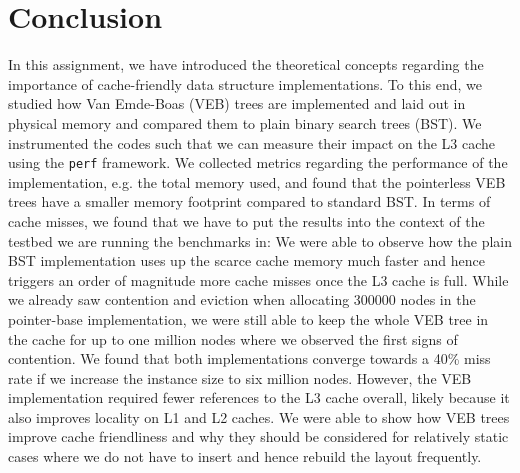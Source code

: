 \documentclass{article}
\begin{document}
\section{Conclusion}
In this assignment, we have introduced the theoretical concepts regarding the importance of cache-friendly data structure implementations. To this end, we studied how Van Emde-Boas (VEB) trees are implemented and laid out in physical memory and compared them to plain binary search trees (BST). We instrumented the codes such that we can measure their impact on the L3 cache using the \texttt{perf} framework. We collected metrics regarding the performance of the implementation, e.g. the total memory used, and found that the pointerless VEB trees have a smaller memory footprint compared to standard BST. In terms of cache misses, we found that we have to put the results into the context of the testbed we are running the benchmarks in: We were able to observe how the plain BST implementation uses up the scarce cache memory much faster and hence triggers an order of magnitude more cache misses once the L3 cache is full. While we already saw contention and eviction when allocating 300000 nodes in the pointer-base implementation, we were still able to keep the whole VEB tree in the cache for up to one million nodes where we observed the first signs of contention. We found that both implementations converge towards a 40\% miss rate if we increase the instance size to six million nodes. However, the VEB implementation required fewer references to the L3 cache overall, likely because it also improves locality on L1 and L2 caches. We were able to show how VEB trees improve cache friendliness and why they should be considered for relatively static cases where we do not have to insert and hence rebuild the layout frequently.    



\newpage
\printbibliography
\end{document}
